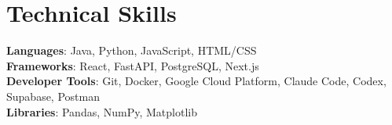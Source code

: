 \documentclass[letterpaper,11pt]{article}
\begin{document}
%
\section{Technical Skills}
 \begin{itemize}[leftmargin=0.15in, label={}]
    \small{\item{
     \textbf{Languages}{: Java, Python, JavaScript, HTML/CSS} \\
     \textbf{Frameworks}{: React, FastAPI, PostgreSQL, Next.js} \\
     \textbf{Developer Tools}{: Git, Docker, Google Cloud Platform, Claude Code, Codex, Supabase, Postman} \\
     \textbf{Libraries}{: Pandas, NumPy, Matplotlib}
    }}
 \end{itemize}
\end{document}
